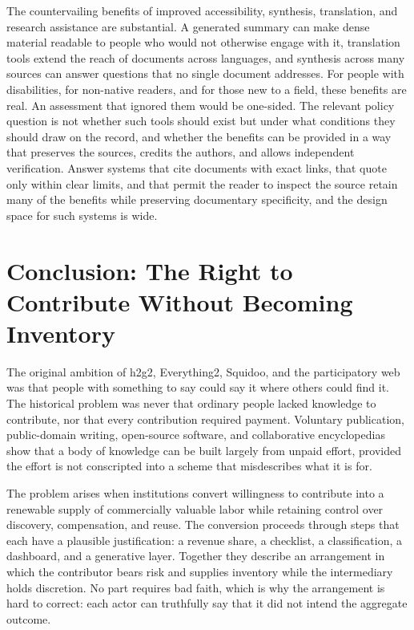 \documentclass[11pt]{article}
\theoremstyle{remark}
\begin{document}
The countervailing benefits of improved accessibility, synthesis, translation, and research assistance are substantial. A generated summary can make dense material readable to people who would not otherwise engage with it, translation tools extend the reach of documents across languages, and synthesis across many sources can answer questions that no single document addresses. For people with disabilities, for non-native readers, and for those new to a field, these benefits are real. An assessment that ignored them would be one-sided. The relevant policy question is not whether such tools should exist but under what conditions they should draw on the record, and whether the benefits can be provided in a way that preserves the sources, credits the authors, and allows independent verification. Answer systems that cite documents with exact links, that quote only within clear limits, and that permit the reader to inspect the source retain many of the benefits while preserving documentary specificity, and the design space for such systems is wide.

\section*{Conclusion: The Right to Contribute Without Becoming Inventory}

The original ambition of h2g2, Everything2, Squidoo, and the participatory web was that people with something to say could say it where others could find it. The historical problem was never that ordinary people lacked knowledge to contribute, nor that every contribution required payment. Voluntary publication, public-domain writing, open-source software, and collaborative encyclopedias show that a body of knowledge can be built largely from unpaid effort, provided the effort is not conscripted into a scheme that misdescribes what it is for.

The problem arises when institutions convert willingness to contribute into a renewable supply of commercially valuable labor while retaining control over discovery, compensation, and reuse. The conversion proceeds through steps that each have a plausible justification: a revenue share, a checklist, a classification, a dashboard, and a generative layer. Together they describe an arrangement in which the contributor bears risk and supplies inventory while the intermediary holds discretion. No part requires bad faith, which is why the arrangement is hard to correct: each actor can truthfully say that it did not intend the aggregate outcome.
\end{document}

